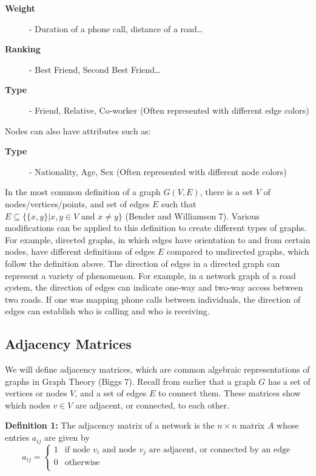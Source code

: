 \documentclass{article}
\begin{document}
\bigskip
\begin{description}
  \item[\textbf{Weight}] - Duration of a phone call, distance of a road\dots
  \item[\textbf{Ranking}] - Best Friend, Second Best Friend\dots
  \item[\textbf{Type}] - Friend, Relative, Co-worker (Often represented with different edge colors)  
\end{description}

\bigskip

\noindent Nodes can also have attributes such as:
\bigskip
\begin{description}
  \item[\textbf{Type}] - Nationality, Age, Sex (Often represented with different node colors)
\end{description}
\bigskip
In the most common definition of a graph $G(V, E)$, there is a set $V$ of nodes/vertices/points, and set of edges $E$ such that \\$E \subseteq \{\{x, y\} | x, y \in V \text{ and } x \neq y\}$ (Bender and Williamson 7). 
Various modifications can be applied to this definition to create different types of graphs. 
For example, directed graphs, in which edges have orientation to and from certain nodes, have different definitions of edges $E$ compared to undirected graphs, which follow the definition above. 
The direction of edges in a directed graph can represent a variety of phenomenon. 
For example, in a network graph of a road system, the direction of edges can indicate one-way and two-way access between two roads. If one was mapping phone calls between individuals, 
the direction of edges can establish who is calling and who is receiving.  

\subsection{Adjacency Matrices}
We will define adjacency matrices, which are common algebraic representations of graphs in Graph Theory (Biggs 7).
Recall from earlier that a graph $G$ has a set of vertices or nodes $V$, and a set of edges $E$ to connect them.
These matrices show which nodes $v \in V$ are adjacent, or connected, to each other.

\bigskip

\textbf{Definition 1:} The adjacency matrix of a network is the $n \times n$ matrix $A$ whose entries $a_{ij}$ are given by
\[   
a_{ij} = 
     \begin{cases}
       1 & \text{if node } v_i \text{ and node } v_j \text{ are adjacent, or connected by an edge} \\
       0 & \text{otherwise} \\
     \end{cases}
\]
\end{document}

